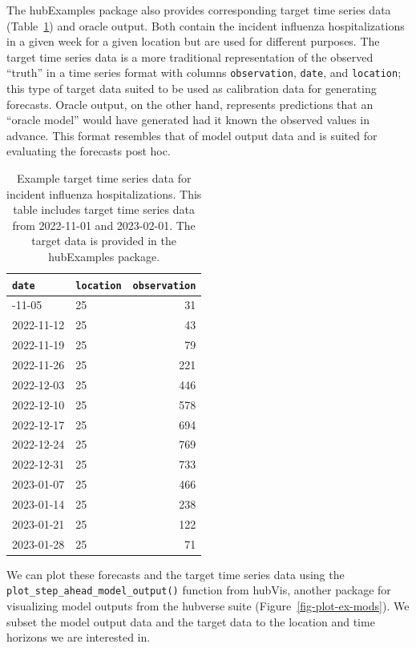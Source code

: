 \documentclass[
  letterpaper,
  DIV=11,
  numbers=noendperiod]{scrartcl}
\begin{document}
The {hubExamples} package also provides corresponding target time series
data (Table~\ref{tbl-example-target-time-series-data}) and oracle
output. Both contain the incident influenza hospitalizations in a given
week for a given location but are used for different purposes. The
target time series data is a more traditional representation of the
observed ``truth'' in a time series format with columns
\texttt{observation}, \texttt{date}, and \texttt{location}; this type of
target data suited to be used as calibration data for generating
forecasts. Oracle output, on the other hand, represents predictions that
an ``oracle model'' would have generated had it known the observed
values in advance. This format resembles that of model output data and
is suited for evaluating the forecasts post hoc.

\begin{longtable}[]{@{}llr@{}}

\caption{\label{tbl-example-target-time-series-data}Example target time
series data for incident influenza hospitalizations. This table includes
target time series data from 2022-11-01 and 2023-02-01. The target data
is provided in the {hubExamples} package.}

\tabularnewline

\toprule\noalign{}
\texttt{date} & \texttt{location} & \texttt{observation} \\
\midrule\noalign{}
\endhead
\bottomrule\noalign{}
\endlastfoot
2022-11-05 & 25 & 31 \\
2022-11-12 & 25 & 43 \\
2022-11-19 & 25 & 79 \\
2022-11-26 & 25 & 221 \\
2022-12-03 & 25 & 446 \\
2022-12-10 & 25 & 578 \\
2022-12-17 & 25 & 694 \\
2022-12-24 & 25 & 769 \\
2022-12-31 & 25 & 733 \\
2023-01-07 & 25 & 466 \\
2023-01-14 & 25 & 238 \\
2023-01-21 & 25 & 122 \\
2023-01-28 & 25 & 71 \\

\end{longtable}

We can plot these forecasts and the target time series data using the
\texttt{plot\_step\_ahead\_model\_output()} function from {hubVis},
another package for visualizing model outputs from the hubverse suite
(Figure~\ref{fig-plot-ex-mods}). We subset the model output data and the
target data to the location and time horizons we are interested in.
\end{document}
